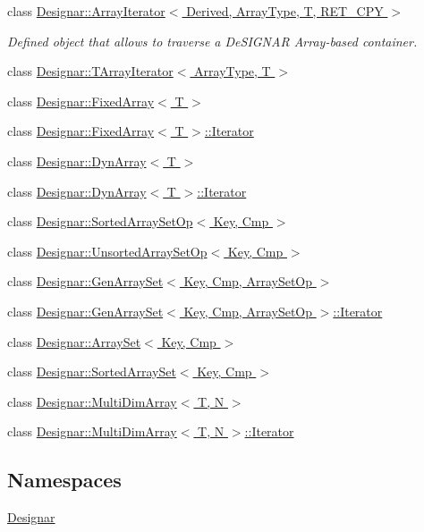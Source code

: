 \begin{DoxyCompactItemize}
\item 
class \hyperlink{class_designar_1_1_array_iterator}{Designar\+::\+Array\+Iterator$<$ Derived, Array\+Type, T, R\+E\+T\+\_\+\+C\+P\+Y $>$}
\begin{DoxyCompactList}\small\item\em Defined object that allows to traverse a De\+S\+I\+G\+N\+AR Array-\/based container. \end{DoxyCompactList}\item 
class \hyperlink{class_designar_1_1_t_array_iterator}{Designar\+::\+T\+Array\+Iterator$<$ Array\+Type, T $>$}
\item 
class \hyperlink{class_designar_1_1_fixed_array}{Designar\+::\+Fixed\+Array$<$ T $>$}
\item 
class \hyperlink{class_designar_1_1_fixed_array_1_1_iterator}{Designar\+::\+Fixed\+Array$<$ T $>$\+::\+Iterator}
\item 
class \hyperlink{class_designar_1_1_dyn_array}{Designar\+::\+Dyn\+Array$<$ T $>$}
\item 
class \hyperlink{class_designar_1_1_dyn_array_1_1_iterator}{Designar\+::\+Dyn\+Array$<$ T $>$\+::\+Iterator}
\item 
class \hyperlink{class_designar_1_1_sorted_array_set_op}{Designar\+::\+Sorted\+Array\+Set\+Op$<$ Key, Cmp $>$}
\item 
class \hyperlink{class_designar_1_1_unsorted_array_set_op}{Designar\+::\+Unsorted\+Array\+Set\+Op$<$ Key, Cmp $>$}
\item 
class \hyperlink{class_designar_1_1_gen_array_set}{Designar\+::\+Gen\+Array\+Set$<$ Key, Cmp, Array\+Set\+Op $>$}
\item 
class \hyperlink{class_designar_1_1_gen_array_set_1_1_iterator}{Designar\+::\+Gen\+Array\+Set$<$ Key, Cmp, Array\+Set\+Op $>$\+::\+Iterator}
\item 
class \hyperlink{class_designar_1_1_array_set}{Designar\+::\+Array\+Set$<$ Key, Cmp $>$}
\item 
class \hyperlink{class_designar_1_1_sorted_array_set}{Designar\+::\+Sorted\+Array\+Set$<$ Key, Cmp $>$}
\item 
class \hyperlink{class_designar_1_1_multi_dim_array}{Designar\+::\+Multi\+Dim\+Array$<$ T, N $>$}
\item 
class \hyperlink{class_designar_1_1_multi_dim_array_1_1_iterator}{Designar\+::\+Multi\+Dim\+Array$<$ T, N $>$\+::\+Iterator}
\end{DoxyCompactItemize}
\subsection*{Namespaces}
\begin{DoxyCompactItemize}
\item 
 \hyperlink{namespace_designar}{Designar}
\end{DoxyCompactItemize}

